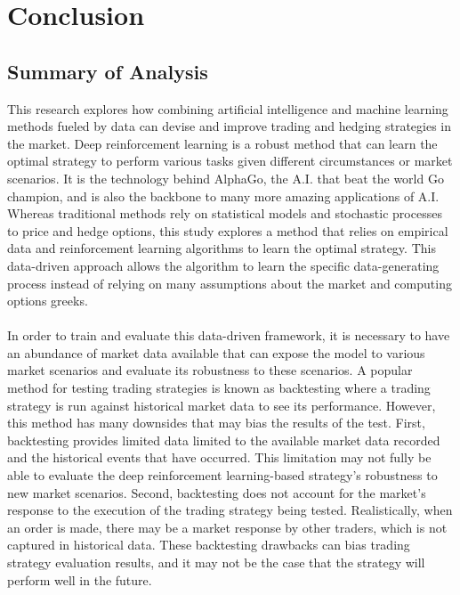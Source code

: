 \chapter{Conclusion}
\section{Summary of Analysis}
This research explores how combining artificial intelligence and machine learning methods fueled by data can devise and improve trading and hedging strategies in the market. Deep reinforcement learning is a robust method that can learn the optimal strategy to perform various tasks given different circumstances or market scenarios. It is the technology behind AlphaGo, the A.I. that beat the world Go champion, and is also the backbone to many more amazing applications of A.I. Whereas traditional methods rely on statistical models and stochastic processes to price and hedge options, this study explores a method that relies on empirical data and reinforcement learning algorithms to learn the optimal strategy. This data-driven approach allows the algorithm to learn the specific data-generating process instead of relying on many assumptions about the market and computing options greeks.
\\ \\
In order to train and evaluate this data-driven framework, it is necessary to have an abundance of market data available that can expose the model to various market scenarios and evaluate its robustness to these scenarios. A popular method for testing trading strategies is known as backtesting where a trading strategy is run against historical market data to see its performance. However, this method has many downsides that may bias the results of the test. First, backtesting provides limited data limited to the available market data recorded and the historical events that have occurred. This limitation may not fully be able to evaluate the deep reinforcement learning-based strategy's robustness to new market scenarios. Second, backtesting does not account for the market's response to the execution of the trading strategy being tested. Realistically, when an order is made, there may be a market response by other traders, which is not captured in historical data. These backtesting drawbacks can bias trading strategy evaluation results, and it may not be the case that the strategy will perform well in the future.
